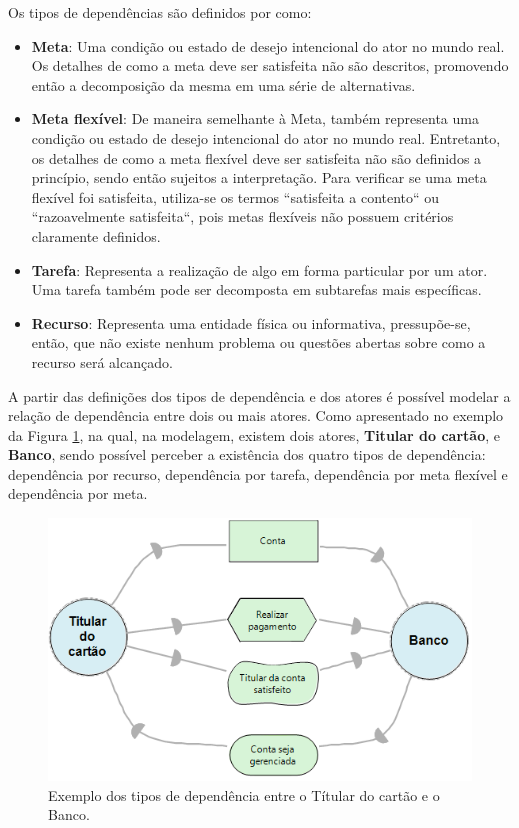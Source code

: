 Os tipos de dependências são definidos por \cite{istarwiki20} como: 

\begin{itemize}
	
	\item \textbf{Meta}: Uma condição ou estado de desejo intencional do ator no mundo real. Os detalhes de como a meta deve ser satisfeita não são descritos, promovendo então a decomposição da mesma em uma série de alternativas.  
	 
	\item \textbf{Meta flexível}: De maneira semelhante à Meta, também representa uma condição ou estado de desejo intencional do ator no mundo real. Entretanto, os detalhes de como a meta flexível deve ser satisfeita não são definidos a princípio, sendo então sujeitos a interpretação. Para verificar se uma meta flexível foi satisfeita, utiliza-se os termos ``satisfeita a contento`` ou ``razoavelmente satisfeita``, pois metas flexíveis não possuem critérios claramente definidos. 
	
	\item \textbf{Tarefa}: Representa a realização de algo em forma particular por um ator. Uma tarefa também pode ser decomposta em subtarefas mais específicas. 
	
	\item \textbf{Recurso}: Representa uma entidade física ou informativa, pressupõe-se, então, que não existe nenhum problema ou questões abertas sobre como a recurso será alcançado.
	 
\end{itemize}

A partir das definições dos tipos de dependência e dos atores é possível modelar a relação de dependência entre dois ou mais atores. Como apresentado no exemplo da Figura \ref{exemploTipoDeDepencia}, na qual, na modelagem, existem dois atores, \textbf{Titular do cartão}, e \textbf{Banco}, sendo possível perceber a existência dos quatro tipos de dependência: dependência por recurso, dependência por tarefa, dependência por meta flexível e dependência por meta.  

\begin{figure}[h!]
	\centering
	\includegraphics[keepaspectratio=true,scale=1.0]{figuras/ExemploTiposDeDependecias.PNG}
	\caption{Exemplo dos tipos de dependência entre o Títular do cartão e o Banco.}
	\label{exemploTipoDeDepencia}
\end{figure} 

